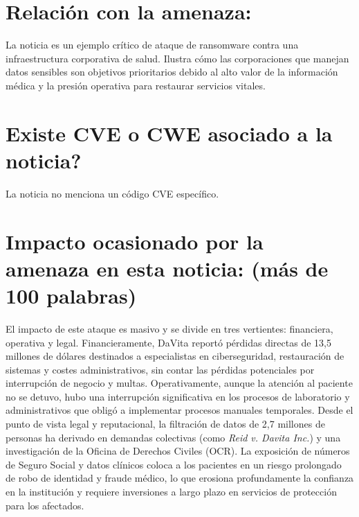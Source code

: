     \section{Relación con la amenaza:}
    La noticia es un ejemplo crítico de ataque de ransomware contra una infraestructura corporativa de salud. Ilustra cómo las corporaciones que manejan datos sensibles son objetivos prioritarios debido al alto valor de la información médica y la presión operativa para restaurar servicios vitales.

    \section{\textquestiondown Existe CVE o CWE asociado a la noticia?}
    La noticia no menciona un código CVE específico.

    \section{Impacto ocasionado por la amenaza en esta noticia: (más de 100 palabras)}
    El impacto de este ataque es masivo y se divide en tres vertientes: financiera, operativa y legal. 
    Financieramente, DaVita reportó pérdidas directas de 13,5 millones de dólares destinados a especialistas en ciberseguridad, 
    restauración de sistemas y costes administrativos, sin contar las pérdidas potenciales por interrupción de negocio y multas. 
    Operativamente, aunque la atención al paciente no se detuvo, hubo una interrupción significativa 
    en los procesos de laboratorio y administrativos que obligó a implementar procesos manuales temporales. 
    Desde el punto de vista legal y reputacional, la filtración de datos de 2,7 millones de personas ha derivado en demandas 
    colectivas (como \textit{Reid v. Davita Inc.}) y una investigación de la Oficina de Derechos Civiles (OCR). 
    La exposición de números de Seguro Social y datos clínicos coloca a los pacientes en un riesgo prolongado de robo de 
    identidad y fraude médico, lo que erosiona profundamente la confianza en la institución y requiere inversiones a 
    largo plazo en servicios de protección para los afectados.

